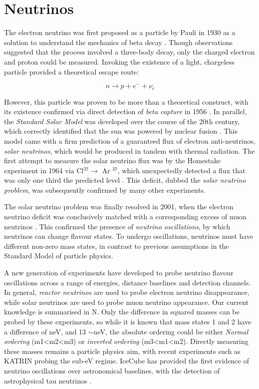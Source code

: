 \section{Neutrinos}

The electron neutrino was first proposed as a particle by Pauli in 1930 as a solution to understand the mechanics of beta decay . Though observations suggested that the process involved a three-body decay, only the charged electron and proton could be measured. Invoking the existence of a light, chargeless particle provided a theoretical escape route:

\begin{equation}
	n \rightarrow p + e^{-} + \nu_{e}
\end{equation}

 However, this particle was proven to be more than a theoretical construct, with its existence confirmed via direct detection of \emph{beta capture} in 1956 . In parallel, the \emph{Standard Solar Model} was developed over the course of the 20th century, which correctly identified that the sun was powered by nuclear fusion . This model came with a firm prediction of a guaranteed flux of electron anti-neutrinos, \emph{solar neutrinos}, which would be produced in tandem with thermal radiation. The first attempt to measure the solar neutrino flux was by the Homestake experiment in 1964 via Cl$^{37} \rightarrow$ Ar $^{37}$, which unexpectedly detected a flux that was only one third the predicted level . This deficit, dubbed the \emph{solar neutrino problem}, was subsequently confirmed by many other experiments.

The solar neutrino problem was finally resolved in 2001, when the electron neutrino deficit was conclusively matched with a corresponding excess of muon neutrinos . This confirmed the presence of \emph{neutrino oscillations}, by which neutrinos can change flavour states. To undergo oscillations, neutrinos must have different non-zero mass states, in contrast to previous assumptions in the Standard Model of particle physics. 

A new generation of experiments have developed to probe neutrino flavour oscillations across a range of energies, distance baselines and detection channels. In general, \emph{reactor neutrinos} are used to probe electron neutrino disappearance, while solar neutrinos are used to probe muon neutrino appearance. Our current knowledge is summarised in N. Only the difference in squared masses can be probed by these experiments, so while it is known that mass states 1 and 2 have a difference of neV, and 13 $\sim$neV, the absolute ordering could be either \emph{Normal ordering} (m1<m2<m3) or \emph{inverted ordering} (m3<m1<m2). Directly measuring these masses remains a particle physics aim, with recent experiments such as KATRIN probing the sub-eV regime. IceCube has provided the first evidence of neutrino oscillations over astronomical baselines, with the detection of astrophysical tau neutrinos .

